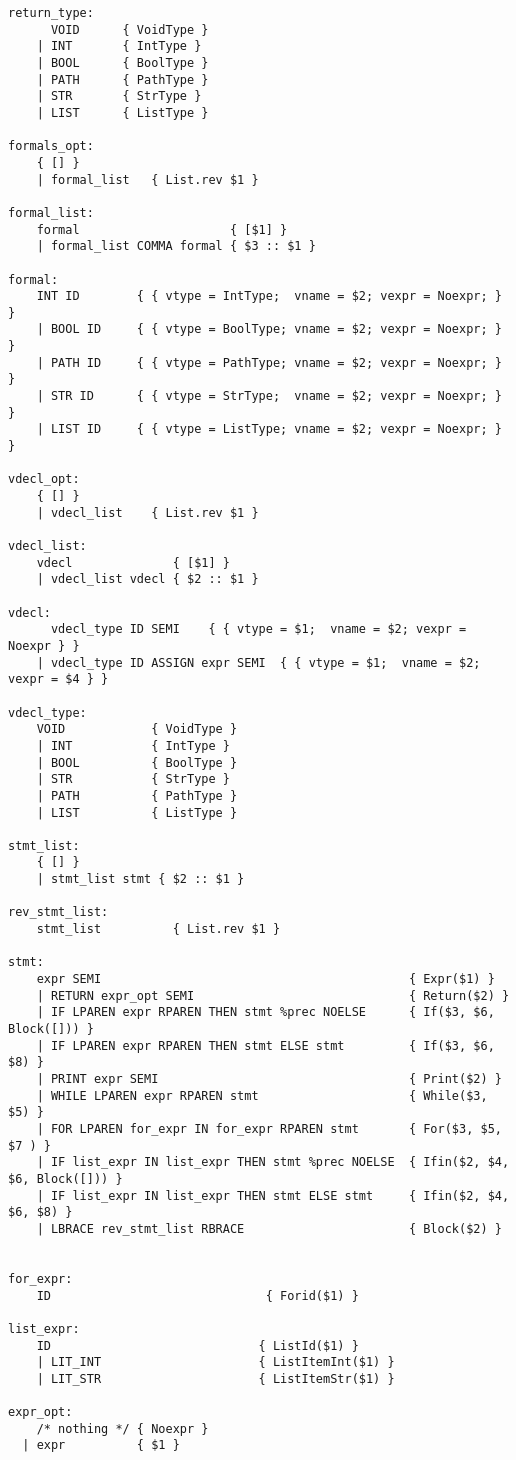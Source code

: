 \documentclass[11pt]{article}
\begin{document}
\begin{listing}[H]
  \begin{verbatim}
return_type:
      VOID      { VoidType }
    | INT       { IntType }
    | BOOL      { BoolType }
    | PATH      { PathType }
    | STR       { StrType }
    | LIST      { ListType }

formals_opt:
    { [] }
    | formal_list   { List.rev $1 }

formal_list:
    formal                     { [$1] }
    | formal_list COMMA formal { $3 :: $1 }

formal:
    INT ID        { { vtype = IntType;  vname = $2; vexpr = Noexpr; } }
    | BOOL ID     { { vtype = BoolType; vname = $2; vexpr = Noexpr; } }
    | PATH ID     { { vtype = PathType; vname = $2; vexpr = Noexpr; } }
    | STR ID      { { vtype = StrType;  vname = $2; vexpr = Noexpr; } }
    | LIST ID     { { vtype = ListType; vname = $2; vexpr = Noexpr; } }

vdecl_opt:
    { [] }
    | vdecl_list    { List.rev $1 }

vdecl_list:
    vdecl              { [$1] }
    | vdecl_list vdecl { $2 :: $1 }

vdecl:
      vdecl_type ID SEMI    { { vtype = $1;  vname = $2; vexpr = Noexpr } }
    | vdecl_type ID ASSIGN expr SEMI  { { vtype = $1;  vname = $2; vexpr = $4 } }

vdecl_type:
    VOID            { VoidType }
    | INT           { IntType }
    | BOOL          { BoolType }
    | STR           { StrType }
    | PATH          { PathType }
    | LIST          { ListType }

stmt_list:
    { [] }
    | stmt_list stmt { $2 :: $1 }

rev_stmt_list:
    stmt_list          { List.rev $1 }

stmt:
    expr SEMI                                           { Expr($1) }
    | RETURN expr_opt SEMI                              { Return($2) }
    | IF LPAREN expr RPAREN THEN stmt %prec NOELSE      { If($3, $6, Block([])) }
    | IF LPAREN expr RPAREN THEN stmt ELSE stmt         { If($3, $6, $8) }
    | PRINT expr SEMI                                   { Print($2) }
    | WHILE LPAREN expr RPAREN stmt                     { While($3, $5) }
    | FOR LPAREN for_expr IN for_expr RPAREN stmt       { For($3, $5, $7 ) }
    | IF list_expr IN list_expr THEN stmt %prec NOELSE  { Ifin($2, $4, $6, Block([])) }
    | IF list_expr IN list_expr THEN stmt ELSE stmt     { Ifin($2, $4, $6, $8) }
    | LBRACE rev_stmt_list RBRACE                       { Block($2) }


for_expr:
    ID                              { Forid($1) }

list_expr:
    ID                             { ListId($1) }
    | LIT_INT                      { ListItemInt($1) }
    | LIT_STR                      { ListItemStr($1) }

expr_opt:
    /* nothing */ { Noexpr }
  | expr          { $1 }

\end{verbatim}
\end{listing}
\end{document}
